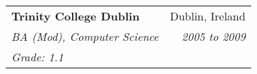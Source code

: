 \documentclass[11pt]{article}
\makeatletter
\newenvironment{newparagraph}{\par\setlength{\rightskip}{3cm}}
\newcommand{\resumeSection}[1]{
    \par
    \vspace{\baselineskip}
    \large {\sc {#1}}
    \par
    \vspace{-0.9\baselineskip}
    \hrulefill
    \vspace{0.5\baselineskip}
    \par
}
\newenvironment{resumeSubSectionHeader}{
    \par
    \begin{tabular*}{\textwidth}{l@{\extracolsep{\fill}}r}
    \par
} {
    \end{tabular*}
    \par
}
\newenvironment{resumeSubSectionBody}{
    \par
    \vspace{-0.8\parskip}
    \begin{small}
    \par
} {
    \par
    \end{small}
    \par
}
\makeatother
\begin{document}
%
%
\begin{resumeSubSectionHeader}

    \textbf{Trinity College Dublin} & Dublin, Ireland \\
    \emph{BA (Mod), Computer Science} & \emph{2005 to 2009} \\
    \emph{Grade: 1.1}

\end{resumeSubSectionHeader}
\begin{resumeSubSectionBody}

\end{resumeSubSectionBody}

\end{document}
